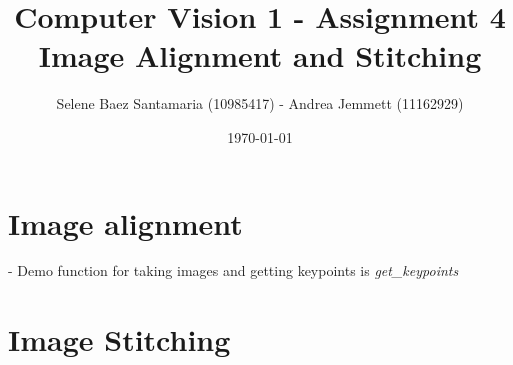 \documentclass[11pt]{article}
\title{
	{Computer Vision 1 - Assignment 4 \\
	Image Alignment and Stitching}
}
\author{
Selene Baez Santamaria (10985417) - Andrea Jemmett (11162929)}
\date{\today}
\begin{document}
\maketitle

\section{Image alignment}

- Demo function for taking images and getting keypoints is \textit{get_keypoints}

\section{Image Stitching}
\end{document}
